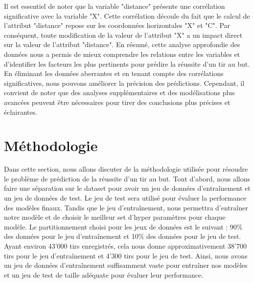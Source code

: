 \documentclass[12pt]{article}
\begin{document}
Il est essentiel de noter que la variable "distance" présente une corrélation significative avec la variable "X". 
Cette corrélation découle du fait que le calcul de l'attribut "distance" repose sur les coordonnées horizontales "X" et "C". 
Par conséquent, toute modification de la valeur de l'attribut "X" a un impact direct sur la valeur de l'attribut "distance".
\newline\newline
En résumé, cette analyse approfondie des données nous a permis de mieux comprendre les relations entre les variables et d'identifier les facteurs les plus pertinents pour prédire la réussite d'un tir au but. 
En éliminant les données aberrantes et en tenant compte des corrélations significatives, nous pouvons améliorer la précision des prédictions.
Cependant, il convient de noter que des analyses supplémentaires et des modélisations plus avancées peuvent être nécessaires pour tirer des conclusions plus précises et éclairantes.

\newpage

\section{Méthodologie}
\label{sec:methodologie}
Dans cette section, nous allons discuter de la méthodologie utilisée pour résoudre le problème de prédiction de la réussite d'un tir au but.
Tout d'abord, nous allons faire une séparation sur le dataset pour avoir un jeu de données d'entraînement et un jeu de données de test.
Le jeu de test sera utilisé pour évaluer la performance des modèles finaux. 
Tandis que le jeu d'entraînement, nous permettra d'entraîner notre modèle et de choisir le meilleur set d'hyper paramètres pour chaque modèle.
Le partitionnement choisi pour les jeux de données est le suivant : 90\% des données pour le jeu d'entraînement et 10\% des données pour le jeu de test.
Ayant environ 43'000 tirs enregistrés, cela nous donne approximativement 38'700 tirs pour le jeu d'entraînement et 4'300 tirs pour le jeu de test.
Ainsi, nous avons un jeu de données d'entraînement suffisamment vaste pour entraîner nos modèles et un jeu de test de taille adéquate pour évaluer leur performance.
\end{document}

